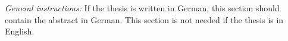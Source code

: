 {\textsl{General instructions:}} 
If the thesis is written in German, this section
should contain the abstract in German. This section is not needed if 
the thesis is in English.
